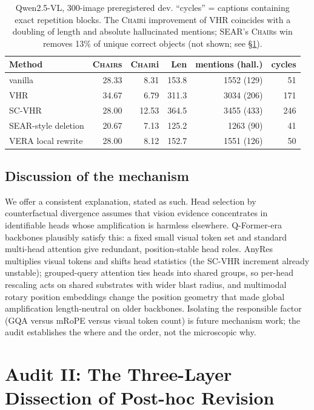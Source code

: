 \documentclass[11pt]{article}
\newcommand{\chair}{\textsc{Chair}}
\newcommand{\vhr}{VHR}
\newcommand{\scvhr}{SC-VHR}
\begin{document}
\begin{table}[t]
\centering\small
\begin{tabular}{lrrrrr}
\toprule
Method & \chair{s} & \chair{i} & Len & mentions (hall.) & cycles \\
\midrule
vanilla & 28.33 & 8.31 & 153.8 & 1552 (129) & 51 \\
\vhr{} & 34.67 & 6.79 & 311.3 & 3034 (206) & 171 \\
\scvhr{} & 28.00 & 12.53 & 364.5 & 3455 (433) & 246 \\
SEAR-style deletion & 20.67 & 7.13 & 125.2 & 1263 (90) & 41 \\
VERA local rewrite & 28.00 & 8.12 & 152.7 & 1551 (126) & 50 \\
\bottomrule
\end{tabular}
\caption{Qwen2.5-VL, 300-image preregistered dev. ``cycles'' = captions containing exact repetition blocks. The \chair{i} improvement of \vhr{} coincides with a doubling of length and absolute hallucinated mentions; SEAR's \chair{s} win removes 13\% of unique correct objects (not shown; see \S\ref{sec:audit2}).}
\label{tab:qwen}
\end{table}

\subsection{Discussion of the mechanism}
We offer a consistent explanation, stated as such. Head selection by counterfactual divergence assumes that vision evidence concentrates in identifiable heads whose amplification is harmless elsewhere. Q-Former-era backbones plausibly satisfy this: a fixed small visual token set and standard multi-head attention give redundant, position-stable head roles. AnyRes multiplies visual tokens and shifts head statistics (the \scvhr{} increment already unstable); grouped-query attention ties heads into shared groups, so per-head rescaling acts on shared substrates with wider blast radius, and multimodal rotary position embeddings change the position geometry that made global amplification length-neutral on older backbones. Isolating the responsible factor (GQA versus mRoPE versus visual token count) is future mechanism work; the audit establishes the where and the order, not the microscopic why.

\section{Audit II: The Three-Layer Dissection of Post-hoc Revision}
\label{sec:audit2}
\end{document}
